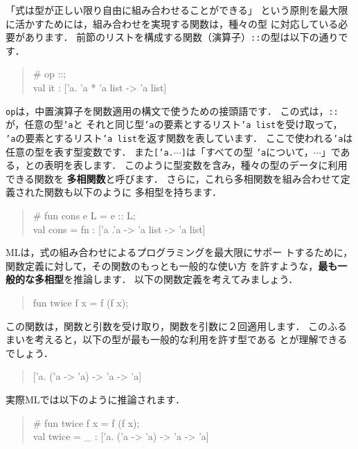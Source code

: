 \documentclass{jbook}
\begin{document}
\ifjp%
	「式は型が正しい限り自由に組み合わせることができる」
という原則を最大限に活かすためには，組み合わせを実現する関数は，種々の型
に対応している必要があります．
	前節のリストを構成する関数（演算子）{\tt ::}の型は以下の通りです．
\begin{tt}
\begin{quote}
\# op ::;\\
val it : ['a. 'a * 'a list -> 'a list]
\end{quote}
\end{tt}
{\tt op}は，中置演算子を関数適用の構文で使うための接頭語です．
	この式は，{\tt ::}が，任意の型{\tt 'a}と
それと同じ型{\tt 'a}の要素とするリスト{\tt 'a list}を受け取って，
{\tt 'a}の要素とするリスト{\tt 'a list}を返す関数を表しています．
	ここで使われる{\tt 'a}は任意の型を表す型変数です．
	また{\tt ['a.$\cdots$]}は「すべての型
{\tt 'a}について，$\cdots$」である，との表明を表します．
	このように型変数を含み，種々の型のデータに利用できる関数を
{\bf 多相関数}と呼びます．
	さらに，これら多相関数を組み合わせて定義された関数も以下のように
多相型を持ちます．
\begin{tt}
\begin{quote}
\# fun cons  e L  = e :: L;
\\
val cons = fn : ['a .'a  ->  'a list  -> 'a list]
\end{quote}
\end{tt}
	MLは，式の組み合わせによるプログラミングを最大限にサポー
トするために，関数定義に対して，その関数のもっとも一般的な使い方
を許すような，{\bf 最も一般的な多相型}を推論します．
	以下の関数定義を考えてみましょう．
\begin{tt}
\begin{quote}
fun twice f x = f (f x);
\end{quote}
\end{tt}
	この関数は，関数と引数を受け取り，関数を引数に２回適用します．
	このふるまいを考えると，以下の型が最も一般的な利用を許す型である
とが理解できるでしょう．
\begin{tt}
\begin{quote}
 ['a. ('a -> 'a) -> 'a -> 'a]
\end{quote}
\end{tt}
	実際MLでは以下のように推論されます．
\begin{tt}
\begin{quote}
\# fun twice f x = f (f x);
\\
val twice = \_ : ['a. ('a -> 'a) -> 'a -> 'a]
\end{quote}
\end{tt}
\end{document}
